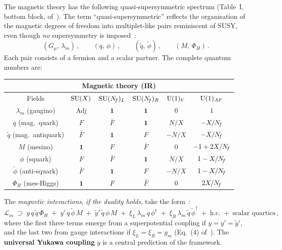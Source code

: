 \documentclass[11pt,a4paper]{article}
\begin{document}
The magnetic theory has
the following quasi-supersymmetric spectrum (Table~I, bottom block,
of~\cite{CacciapagliaSannino2024}).  The term ``quasi-supersymmetric''
reflects the organisation of the magnetic degrees of freedom into
multiplet-like pairs reminiscent of SUSY, even though \emph{no}
supersymmetry is imposed~\cite{AMPS2011}:
\begin{equation}\label{eq:quasi-susy}
  (G_\mu,\, \lambda_m)\,,
  \qquad
  (q,\, \phi)\,,
  \qquad
  (\widetilde{q},\, \widetilde{\phi})\,,
  \qquad
  (M,\, \Phi_H)\,.
\end{equation}
Each pair consists of a fermion and a scalar partner.  The complete
quantum numbers are:

\begin{center}
\renewcommand{\arraystretch}{1.3}
\begin{tabular}{c c c c c c}
\toprule
\multicolumn{6}{c}{\textbf{Magnetic theory (IR)}} \\
\midrule
Fields & $\mathrm{SU}(X)$ & $\mathrm{SU}(N_{\!f})_L$ & $\mathrm{SU}(N_{\!f})_R$ & $\mathrm{U}(1)_V$ & $\mathrm{U}(1)_{AF}$ \\
\midrule
$\lambda_m$ (gaugino) & Adj & $\mathbf{1}$ & $\mathbf{1}$ & $0$ & $1$ \\
$q$ (mag.\ quark) & $F$ & $\bar{F}$ & $\mathbf{1}$ & $N/X$  & $-X/N_{\!f}$ \\
$\widetilde{q}$ (mag.\ antiquark) & $\bar{F}$ & $\mathbf{1}$ & $F$ & $-N/X$ & $-X/N_{\!f}$ \\
$M$ (mesino) & $\mathbf{1}$ & $F$ & $\bar{F}$ & $0$ & $-1+2X/N_{\!f}$ \\
$\phi$ (squark) & $F$ & $\bar{F}$ & $\mathbf{1}$ & $N/X$ & $1-X/N_{\!f}$ \\
$\widetilde{\phi}$ (anti-squark) & $\bar{F}$ & $\mathbf{1}$ & $F$ & $-N/X$ & $1-X/N_{\!f}$ \\
$\Phi_H$ (mes-Higgs) & $\mathbf{1}$ & $F$ & $\bar{F}$ & $0$ & $2X/N_{\!f}$ \\
\bottomrule
\end{tabular}
\label{tab:magnetic-general}
\end{center}

\medskip

The \emph{magnetic interactions}, \emph{if the duality holds}, take the
form~\cite{CacciapagliaSannino2024}:
\begin{equation}\label{eq:mag-lagrangian}
  \mathcal{L}_m \;\supset\;
  y\, q\,\widetilde{q}\, \Phi_H
  \;+\; y'\, q\,\widetilde{\phi}\, M
  \;+\; \widetilde{y}'\, \widetilde{q}\, \phi\, M
  \;+\; \xi_L\, \lambda_m\, q\, \phi^\dagger
  \;+\; \xi_R\, \lambda_m\, \widetilde{q}\, \widetilde{\phi}^\dagger
  \;+\; \text{h.c.}
  \;+\; \text{scalar quartics}\,,
\end{equation}
where the first three terms emerge from a superpotential coupling if
$y = y' = \widetilde{y}'$, and the last two from gauge interactions if
$\xi_L = \xi_R = g_m$ (Eq.~(4) of~\cite{CacciapagliaSannino2024}).
The \textbf{universal Yukawa coupling} $y$ is a central prediction of
the framework.
\end{document}
